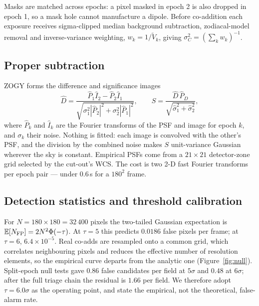 \documentclass[11pt,a4paper]{article}
\begin{document}
{Masks are matched across epochs: a pixel masked in epoch 2 is also dropped in epoch 1, so a mask
hole cannot manufacture a dipole. Before co-addition each exposure receives sigma-clipped median
background subtraction, zodiacal-model removal and inverse-variance weighting,
$w_k = 1/\tilde V_k$, giving $\sigma_C^2 = \left(\sum_k w_k\right)^{-1}$.

\subsection{Proper subtraction}
ZOGY \cite{zogy} forms the difference and significance images
\begin{equation}
\hat D=\frac{\hat P_1\hat I_2-\hat P_2\hat I_1}
             {\sqrt{\sigma_1^2|\hat P_2|^2+\sigma_2^2|\hat P_1|^2}},
\qquad
S=\frac{\hat D\,\hat P_D}{\sqrt{\hat\sigma_1^2+\hat\sigma_2^2}},
\label{eq:zogy}
\end{equation}
where $\hat P_k$ and $\hat I_k$ are the Fourier transforms of the PSF and image for epoch $k$, and
$\sigma_k$ their noise. Nothing is fitted: each image is convolved with the other's PSF, and the
division by the combined noise makes $S$ unit-variance Gaussian wherever the sky is constant.
Empirical PSFs come from a $21\times21$ detector-zone grid selected by the cut-out's WCS. The cost is
two 2-D fast Fourier transforms per epoch pair --- under 0.6\,s for a $180^2$ frame.

\subsection{Detection statistics and threshold calibration}
For $N=180\times180=32\,400$ pixels the two-tailed Gaussian expectation is
$\mathbb{E}[N_{\rm FP}] = 2N^2\Phi(-\tau)$. At $\tau=5$ this predicts $0.0186$ false pixels per
frame; at $\tau=6$, $6.4\times10^{-5}$. Real co-adds are resampled onto a common grid, which
correlates neighbouring pixels and reduces the effective number of resolution elements, so the
empirical curve departs from the analytic one (Figure~\ref{fig:null}). Split-epoch null tests gave
$0.86$ false candidates per field at $5\sigma$ and $0.48$ at $6\sigma$; after the full triage chain
the residual is $1.66$ per field. We therefore adopt $\tau=6.0\sigma$ as the operating point, and
state the empirical, not the theoretical, false-alarm rate.

}
\end{document}
